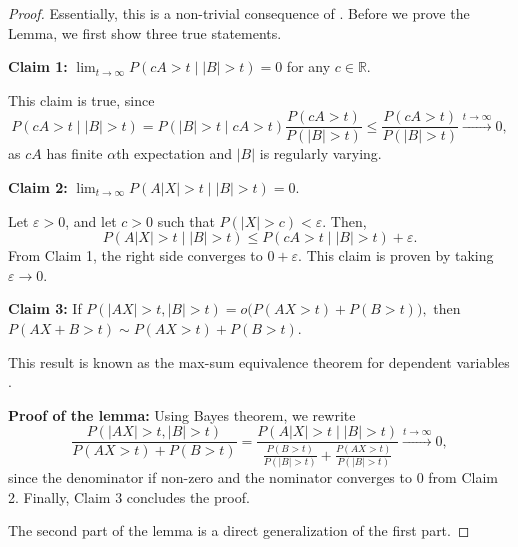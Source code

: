 \documentclass[a4paper,11pt]{article}
\begin{document}
\begin{proof}
Essentially, this is a non-trivial consequence of  \citep[Lemma B.6]{SRE}. Before we prove the Lemma, we first show three true statements. 

\textbf{Claim 1: }  $\lim_{t\to\infty}P(cA>t\mid |B|>t)= 0$ for any $c\in\mathbb{R}$.

This claim is true, since $$
P(cA>t\mid |B|>t) = P(|B|>t\mid cA>t)\frac{P(cA>t)}{P(|B|>t)}\leq \frac{P(cA>t)}{P(|B|>t)}\overset{t\to\infty}{\to} 0,
$$
as $cA$ has finite $\alpha$th expectation and $|B|$ is regularly varying. 

\textbf{Claim 2: } $\lim_{t\to\infty}P(A|X|>t\mid |B|>t)= 0.$ 

Let $\varepsilon>0$, and let $c>0$ such that $P(|X|>c)<\varepsilon$. Then, $$P(A|X|>t\mid |B|>t)\leq P(cA>t\mid |B|>t)+\varepsilon.$$
From Claim 1, the right side converges to $0+\varepsilon$. This claim is proven by taking $\varepsilon\to 0$. 

\textbf{Claim 3:}  If $
    P(|AX|>t, |B|>t) = o\big(P(AX>t)+P(B>t)\big),
    $    then $P(AX+B>t)\sim P(AX>t)+P(B>t)$. 

    This result is known as the max-sum equivalence theorem for dependent variables  \citep[Lemma B.6]{SRE}. 

\textbf{Proof of the lemma:     } Using Bayes theorem, we rewrite $$ \frac{P(|AX|>t, |B|>t)}{P(AX>t)+P(B>t)} = \frac{P(A|X|>t\mid |B|>t)}{\frac{P(B>t)}{P(|B|>t)}+\frac{P(AX>t)}{P(|B|>t)}}\overset{t\to\infty}{\to}0,$$
since the denominator if non-zero and the nominator converges to $0$ from Claim 2. Finally, Claim 3 concludes the proof.  

The second part of the lemma is a direct generalization of the first part. 

\end{proof}
\end{document}
